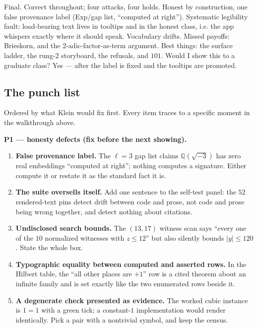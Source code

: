\begin{knote}
Final. Correct throughout; four attacks, four holds. Honest by construction, one false provenance label (Exp/gap list, ``computed at right''). Systematic legibility fault: load-bearing text lives in tooltips and in the honest class, i.e. the app whispers exactly where it should speak. Vocabulary drifts. Missed payoffs: Brieskorn, and the 2-adic-factor-as-term argument. Best things: the surface ladder, the rung-2 storyboard, the refusals, and $101$. Would I show this to a graduate class? Yes --- after the label is fixed and the tooltips are promoted.
\end{knote}

\subsection*{The punch list}

Ordered by what Klein would fix first. Every item traces to a specific moment in the walkthrough above.

\textbf{P1 --- honesty defects (fix before the next showing).}
\begin{enumerate}[leftmargin=1.4em,itemsep=2pt]
\item \textbf{False provenance label.} The $\ell = 3$ gap list claims $\mathbb{Q}(\sqrt{-3})$ has zero real embeddings ``computed at right''; nothing computes a signature. Either compute it or restate it as the standard fact it is.
\item \textbf{The suite oversells itself.} Add one sentence to the self-test panel: the $52$ rendered-text pins detect drift between code and prose, not code and prose being wrong together, and detect nothing about citations.
\item \textbf{Undisclosed search bounds.} The $(13,17)$ witness scan says ``every one of the $10$ normalized witnesses with $z \le 12$'' but also silently bounds $|y| \le 120$. State the whole box.
\item \textbf{Typographic equality between computed and asserted rows.} In the Hilbert table, the ``all other places are $+1$'' row is a cited theorem about an infinite family and is set exactly like the two enumerated rows beside it.
\item \textbf{A degenerate check presented as evidence.} The worked cubic instance is $1 = 1$ with a green tick; a constant-$1$ implementation would render identically. Pick a pair with a nontrivial symbol, and keep the census.
\end{enumerate}

